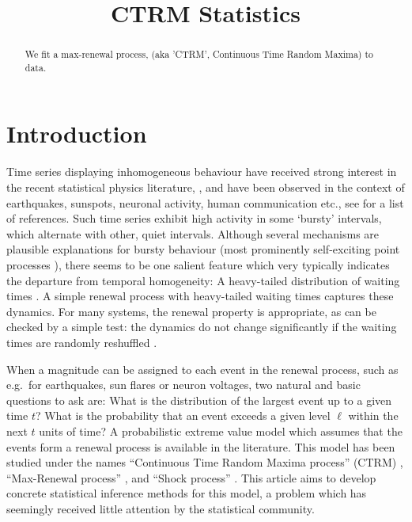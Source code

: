 \documentclass[12pt]{article}
\theoremstyle{definition}
\theoremstyle{remark}
\numberwithin{equation}{section}
\newcommand{\1}{\mathbf 1}
\begin{document}

\title{CTRM Statistics}
\maketitle
\begin{abstract}
We fit a max-renewal process, (aka 'CTRM', Continuous Time Random Maxima)
to data. 

\end{abstract}


\section{Introduction}

Time series displaying inhomogeneous behaviour have received strong interest in 
the recent statistical physics literature,
\cite{Barabasi2005,Oliveira2005,Vasquez2006,Vazquez2007,Omi2011,
Min2010,Karsai2011,Bagrow2013},
and have been observed in the context of earthquakes, sunspots, neuronal
activity, human communication etc., see \cite{Karsai2012,Vajna2013} for a 
list of references.
Such time series exhibit high activity in some `bursty' intervals, which 
alternate with other, quiet intervals.  Although several mechanisms are 
plausible explanations for bursty behaviour
(most prominently self-exciting point processes \cite{hawkes1971point}),
there seems to be one salient
feature which very typically indicates the departure from temporal homogeneity: 
A heavy-tailed distribution of waiting times
\cite{Vasquez2006,Karsai2012,Vajna2013}. 
A simple renewal process with heavy-tailed waiting times captures these
dynamics. For many systems, the renewal property is appropriate, as can be
checked by a simple test: the dynamics do not change significantly if the
waiting times are randomly reshuffled \cite{Karsai2012}.

When a magnitude can be assigned to each event in the renewal process, 
such as e.g.\
for earthquakes, sun flares or neuron voltages,
two natural and basic questions to ask are: 
What is the distribution of the largest event up to a given time $t$?
What is the probability that an event exceeds a given level $\ell$ within the
next $t$ units of time?
A probabilistic extreme value model which assumes that the events form a 
renewal process is available in the literature. 
This model has been studied under the names
``Continuous Time Random Maxima process'' (CTRM) 
\cite{Benson2007,MeerschaertStoev08,Hees16,Hees14}, 
``Max-Renewal process'' \cite{Silvestrov2002a,ST04,Basrak2014}, 
and ``Shock process'' 
\cite{Esary1973,Sumita1983,Sumita1984,Sumita1985,Anderson1987,Gut1999}.
This article aims to develop concrete statistical inference methods for this model, 
a problem which has seemingly received little attention by the statistical 
community. 
\end{document}
